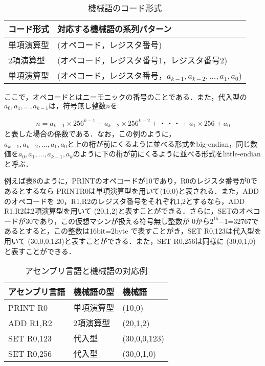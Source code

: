 \documentclass[a4j]{jsarticle}  %
\begin{document}
\begin{table}[htb]
  \begin{center}
    \caption{機械語のコード形式}
\begin{tabular}{l|l} \hline
コード形式 & 対応する機械語の系列パターン \\ \hline
単項演算型 & (オペコード，レジスタ番号) \\
2項演算型 & (オペコード，レジスタ番号1，レジスタ番号2) \\
単項演算型 & (オペコード，レジスタ番号，$a_{k-1},a_{k-2},...,a_1,a_0$) \\ \hline
\end{tabular} 
\end{center}
\end{table}

ここで，オペコードとはニーモニックの番号のことである．また，代入型の$a_0,a_1,...,a_{k−1}は，符号無し整数nを$

\begin{eqnarray*}
n=a_{k-1}×256^{k-1}+a_{k-2}×256^{k-2}+・・・+a_1×256+a_0
\end{eqnarray*}
と表した場合の係数である．なお，この例のように，$a_{k−1},a_{k−2},...,a_1,a_0と上の桁が前にくるように並べる形$式をbig-endian，同じ数値を$a_0,a_1,...,a_{k−1},a_k$のように下の桁が前にくるように並べる形式をlittle-endianと呼ぶ．

例えば表8のように，PRINTのオペコードが10であり，R0のレジスタ番号が0であるとするなら
PRINTR0は単項演算型を用いて(10,0)と表される．また，ADDのオペコードを
20，R1,R2のレジスタ番号をそれぞれ1,2とするなら，ADD R1,R2は2項演算型を用いて
(20,1,2)と表すことができる．さらに，SETのオペコードが30であり，この仮想マシンが扱える符号無し整数が
0から$2^{15}$−1=32767であるとすると，この整数は16bit=2byte
で表すことがき，SET R0,123は代入型を用いて
(30,0,0,123)と表すことができる．また，SET R0,256は同様に
(30,0,1,0)と表すことができる．

\begin{table}[htb]
  \begin{center}
    \caption{アセンブリ言語と機械語の対応例}
\begin{tabular}{l|ll} \hline
アセンブリ言語 & 機械語の型 & 機械語 \\ \hline
PRINT R0 & 単項演算型 & (10,0) \\
ADD R1,R2 & 2項演算型 & (20,1,2) \\
SET R0,123 & 代入型 & (30,0,0,123) \\
SET R0,256 & 代入型 & (30,0,1,0) \\ \hline
\end{tabular} 
\end{center}
\end{table}
\end{document}
